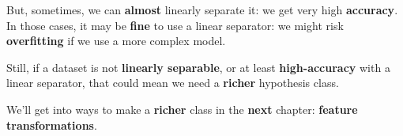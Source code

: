         But, sometimes, we can \textbf{almost} linearly separate it: we get very high \textbf{accuracy}. In those cases, it may be \textbf{fine} to use a linear separator: we might risk \textbf{overfitting} if we use a more complex model.
        
        Still, if a dataset is not \textbf{linearly separable}, or at least \textbf{high-accuracy} with a linear separator, that could mean we need a \textbf{richer} hypothesis class. 
        
        We'll get into ways to make a \textbf{richer} class in the \textbf{next} chapter: \textbf{feature transformations}.
